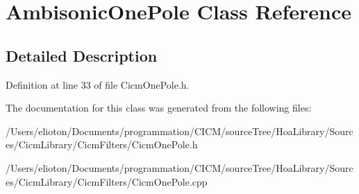 \hypertarget{class_ambisonic_one_pole}{\section{Ambisonic\-One\-Pole Class Reference}
\label{class_ambisonic_one_pole}
}


\subsection{Detailed Description}


Definition at line 33 of file Cicm\-One\-Pole.\-h.



The documentation for this class was generated from the following files\-:\begin{DoxyCompactItemize}
\item 
/\-Users/elioton/\-Documents/programmation/\-C\-I\-C\-M/source\-Tree/\-Hoa\-Library/\-Sources/\-Cicm\-Library/\-Cicm\-Filters/Cicm\-One\-Pole.\-h\item 
/\-Users/elioton/\-Documents/programmation/\-C\-I\-C\-M/source\-Tree/\-Hoa\-Library/\-Sources/\-Cicm\-Library/\-Cicm\-Filters/Cicm\-One\-Pole.\-cpp\end{DoxyCompactItemize}
